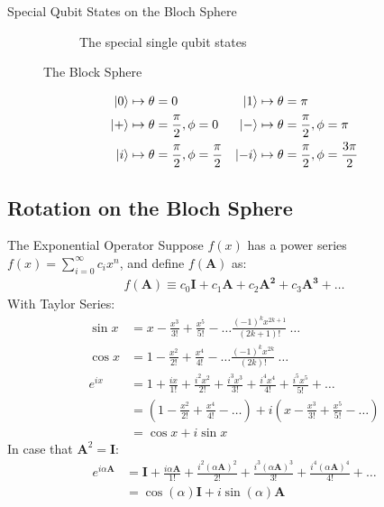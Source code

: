\documentclass{beamer}
\begin{document}
\begin{frame}{Special Qubit States on the Bloch Sphere}
{\begin{figure}
\begin{subfigure}[b]{0.5\textwidth}
      \caption{The special single qubit states\tiny\cite{singlequbitstates}}
    \end{subfigure}
    \caption{The Block Sphere}
  \end{figure}
  \begin{align*}
  \ket0 &\mapsto \theta = 0                     & \ket1 &\mapsto \theta = \pi \\
  \ket+ &\mapsto \theta = \frac{\pi}2, \phi = 0 & \ket- &\mapsto \theta = \frac{\pi}2, \phi = \pi \\
  \ket{i} &\mapsto \theta = \frac{\pi}2, \phi = \frac{\pi}2 & \ket{-i} &\mapsto \theta = \frac{\pi}2, \phi = \frac{3\pi}2
  \end{align*}
  }%
\end{frame}

\subsection{Rotation on the Bloch Sphere}
\begin{frame}{The Exponential Operator\tiny\cite{rotationsonblochsphere}}
  {\tiny
    Suppose $f(x)$ has a power series $f(x) = \sum_{i=0}^{\infty}c_ix^n$, and define $f(\mathbf{A})$ as:
    \begin{align*}
    f(\mathbf{A}) \equiv c_0\mathbf{I} + c_1\mathbf{A} + c_2\mathbf{A^2} + c_3\mathbf{A^3} + \dots
    \end{align*}
    With Taylor Series:
    \begin{align*}
      \sin{x} &= x - \frac{x^3}{3!} + \frac{x^5}{5!} - \dots \frac{(-1)^kx^{2k+1}}{(2k+1)!}\ \dots \\
      \cos{x} &= 1 - \frac{x^2}{2!} + \frac{x^4}{4!} - \dots \frac{(-1)^kx^{2k}}{(2k)!}\ \dots \\
      e^{ix} &= 1 + \frac{ix}{1!} + \frac{i^2x^2}{2!} + \frac{i^3x^3}{3!}+ \frac{i^4x^4}{4!} + \frac{i^5x^5}{5!} + \dots \\
             &= (1 - \frac{x^2}{2!} + \frac{x^4}{4!} - \dots) + i(x - \frac{x^3}{3!} + \frac{x^5}{5!} - \dots) \\
             &= \cos{x} + i\sin{x}
    \end{align*}
    In case that $\mathbf{A}^2=\mathbf{I}$:
    \begin{align*}
      e^{i\alpha\mathbf{A}} &= \mathbf{I}
                                 + \frac{i\alpha\mathbf{A}}{1!}
                                 + \frac{i^2(\alpha\mathbf{A})^2}{2!}
                                 + \frac{i^3(\alpha\mathbf{A})^3}{3!}
                                 + \frac{i^4(\alpha\mathbf{A})^4}{4!}
                                 + \dots \\
                            &= \cos(\alpha)\mathbf{I} + i\sin(\alpha)\mathbf{A}
    \end{align*}
  }%
\end{frame}
\end{document}
